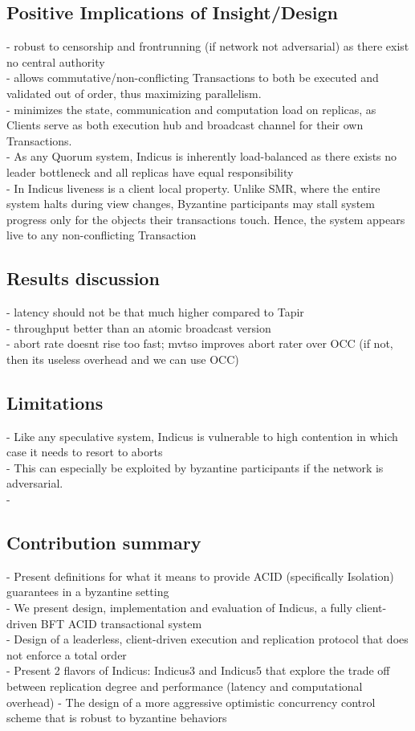 \subsection{Positive Implications of Insight/Design}
- robust to censorship and frontrunning (if network not adversarial) as there exist no central authority \\
-  allows commutative/non-conflicting Transactions to both be executed and validated out of order, thus maximizing parallelism. \\
-  minimizes the state, communication and computation load on replicas, as Clients serve as both execution hub and broadcast channel for their own Transactions. \\
- As any Quorum system, Indicus is inherently load-balanced as there exists no leader bottleneck and all replicas have equal responsibility\\
- In Indicus liveness is a client local property. Unlike SMR, where the entire system halts during view changes, Byzantine participants may stall system progress only for the objects their transactions touch. Hence, the system appears live to any non-conflicting Transaction


\subsection{Results discussion}
- latency should not be that much higher compared to Tapir\\
- throughput better than an atomic broadcast version\\
- abort rate doesnt rise too fast; mvtso improves abort rater over OCC (if not, then its useless overhead and we can use OCC)


\subsection{Limitations}
 - Like any speculative system, Indicus is vulnerable to high contention in which case it needs to resort to aborts\\
 - This can especially be exploited by byzantine participants if the network is adversarial.\\
 - 

\subsection{Contribution summary}
 - Present definitions for what it means to provide ACID (specifically Isolation) guarantees in a byzantine setting\\
 - We present design, implementation and evaluation of Indicus, a fully client-driven BFT ACID transactional system \\
 - Design of a leaderless, client-driven execution and replication protocol that does not enforce a total order\\
 - Present 2 flavors of Indicus: Indicus3 and Indicus5 that explore the trade off between replication degree and performance (latency and computational overhead)
 - The design of a more aggressive optimistic concurrency control scheme that is robust to byzantine behaviors
 